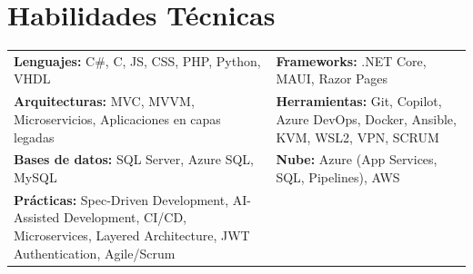 \section*{Habilidades Técnicas}
\begin{tabularx}{\textwidth}{X X}
\textbf{Lenguajes:} C\#, C, JS, CSS, PHP, Python, VHDL & 
\textbf{Frameworks:} .NET Core, MAUI, Razor Pages \\

\textbf{Arquitecturas:} MVC, MVVM, Microservicios, Aplicaciones en capas legadas & 
\textbf{Herramientas:} Git, Copilot, Azure DevOps, Docker, Ansible, KVM, WSL2, VPN, SCRUM \\
\textbf{Bases de datos:} SQL Server, Azure SQL, MySQL &
\textbf{Nube:} Azure (App Services, SQL, Pipelines), AWS \\
\textbf{Prácticas:} Spec-Driven Development, AI-Assisted Development, CI/CD, Microservices, Layered Architecture, JWT Authentication, Agile/Scrum & \\
\end{tabularx}
